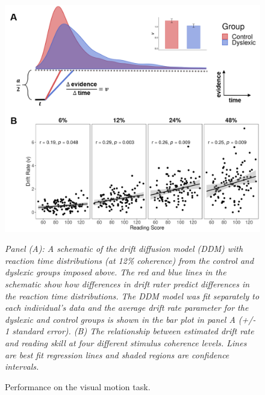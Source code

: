 \documentclass[../uwthesis.tex]{subfiles}
\begin{document}
\begin{figure}
    \centering
    \caption{Performance on the visual motion task.}
    \label{fig:p3_fig2}
    \includegraphics{images/paper_3/2_drift_rates.png}
    \item \textit{Panel (A): A schematic of the drift diffusion model (DDM) with reaction time distributions (at 12\% coherence) from the control and dyslexic groups imposed above. The red and blue lines in the schematic show how differences in drift rater predict differences in the reaction time distributions. The DDM model was fit separately to each individual’s data and the average drift rate parameter for the dyslexic and control groups is shown in the bar plot in panel A (+/- 1 standard error). (B) The relationship between estimated drift rate and reading skill at four different stimulus coherence levels. Lines are best fit regression lines and shaded regions are confidence intervals.}

\end{figure}
\end{document}
